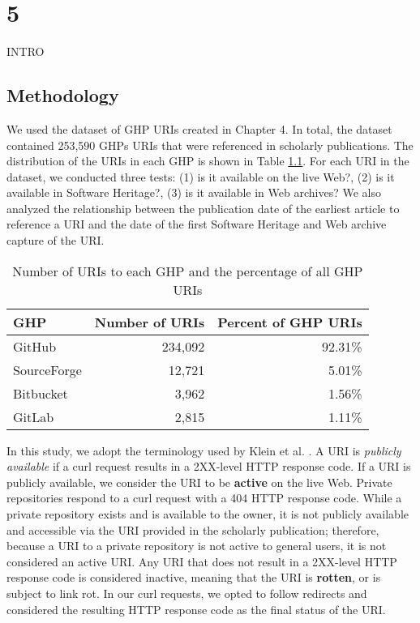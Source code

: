 \chapter{5}
\label{ch:5}


INTRO

\section{Methodology}
We used the dataset of GHP URIs created in Chapter 4. In total, the dataset contained 253,590 GHPs URIs that were referenced in scholarly publications. The distribution of the URIs in each GHP is shown in Table \ref{tab:ghps}. For each URI in the dataset, we conducted three tests: (1) is it available on the live Web?, (2) is it available in Software Heritage?, (3) is it available in Web archives? We also analyzed the relationship between the publication date of the earliest article to reference a URI and the date of the first Software Heritage and Web archive capture of the URI. 

\begin{table}
    \centering
    \begin{tabular}{|l|r|r|}
    \hline
    GHP & Number of URIs & Percent of GHP URIs\\ 
    \hline
    GitHub & 234,092 & 92.31\% \\
    SourceForge & 12,721 & 5.01\% \\
    Bitbucket & 3,962 & 1.56\% \\
    GitLab & 2,815 & 1.11\% \\
    \hline
    \end{tabular}
    \caption{Number of URIs to each GHP and the percentage of all GHP URIs}
    \label{tab:ghps}
\end{table}

In this study, we adopt the terminology used by Klein et al. \cite{klein-plos2014}. A URI is \emph{publicly available} if a curl request results in a 2XX-level HTTP response code. If a URI is publicly available, we consider the URI to be \textbf{active} on the live Web. Private repositories respond to a curl request with a 404 HTTP response code. While a private repository exists and is available to the owner, it is not publicly available and accessible via the URI provided in the scholarly publication; therefore, because a URI to a private repository is not active to general users, it is not considered an active URI. Any URI that does not result in a 2XX-level HTTP response code is considered inactive, meaning that the URI is \textbf{rotten}, or is subject to link rot. In our curl requests, we opted to follow redirects and considered the resulting HTTP response code as the final status of the URI. 

